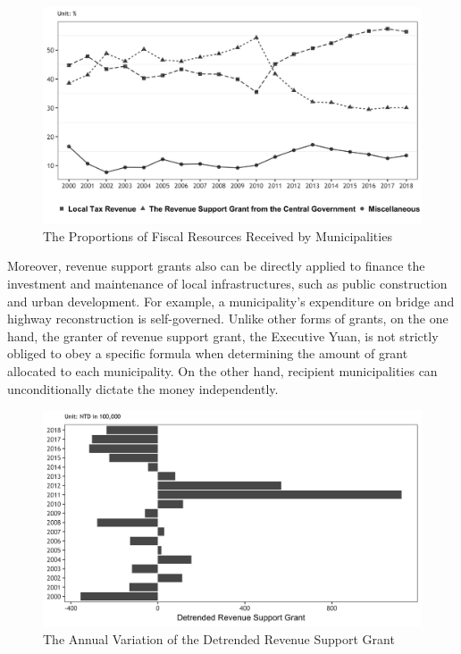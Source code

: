\begin{figure}[ht]
\begin{centering}
\caption{The Proportions of Fiscal Resources Received by Municipalities\label{figure2}}
\par\end{centering}
\centering{}\includegraphics[scale=0.18]{04-Chapter-Four/image/figure2.jpeg}
\end{figure}

Moreover, revenue support grants also can be directly applied to finance the investment and maintenance of local infrastructures, such as public construction and urban development. For example, a municipality's expenditure on bridge and highway reconstruction is self-governed. Unlike other forms of grants, on the one hand, the granter of revenue support grant, the Executive Yuan, is not strictly obliged to obey a specific formula when determining the amount of grant allocated to each municipality. On the other hand, recipient municipalities can unconditionally dictate the money independently. 

\begin{figure}[!htbp]
\begin{centering}
\caption{The Annual Variation of the Detrended Revenue Support Grant\label{figure3}}
\par\end{centering}
\centering{}\includegraphics[scale=0.18]{04-Chapter-Four/image/figure3.jpeg}
\end{figure}


